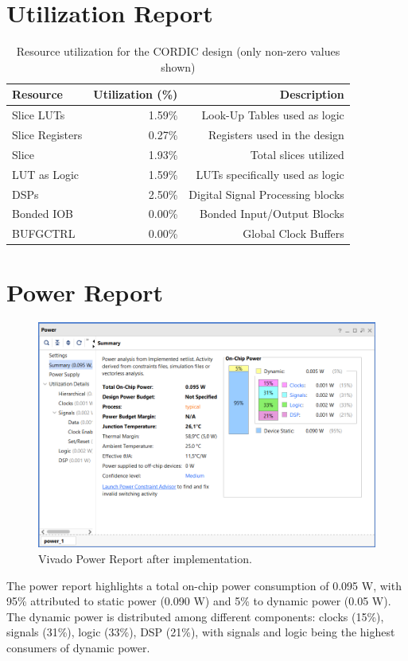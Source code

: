 \section{Utilization Report}
\begin{table}[H]
    \centering
    \small
    \captionsetup{skip=10pt} 
    \begin{tabular}{lrr}
        \hline
        Resource               & Utilization (\%) & Description \\
        \hline
        Slice LUTs             & 1.59\%           & Look-Up Tables used as logic \\
        Slice Registers        & 0.27\%           & Registers used in the design \\
        Slice                  & 1.93\%           & Total slices utilized \\
        LUT as Logic           & 1.59\%           & LUTs specifically used as logic \\
        DSPs                   & 2.50\%           & Digital Signal Processing blocks \\
        Bonded IOB             & 0.00\%           & Bonded Input/Output Blocks \\
        BUFGCTRL               & 0.00\%           & Global Clock Buffers \\
        \hline
    \end{tabular}
    \caption{Resource utilization for the CORDIC design (only non-zero values shown)}
    \label{tab:cordic_resource_utilization}
\end{table}


\section{Power Report}
\begin{figure}[H]
    \centering
    \captionsetup{skip=10pt} 
    \includegraphics[width=\textwidth]{./images/Vivado/power_report.png}
    \caption{Vivado Power Report after implementation.}
    \label{fig:power_report}
\end{figure}
The power report highlights a total on-chip power consumption of 0.095 W, with 95\% attributed to static power (0.090 W) and 5\% to dynamic power (0.05 W). The dynamic power is distributed among different components: clocks (15\%), signals (31\%), logic (33\%), DSP (21\%), with signals and logic being the highest consumers of dynamic power.


